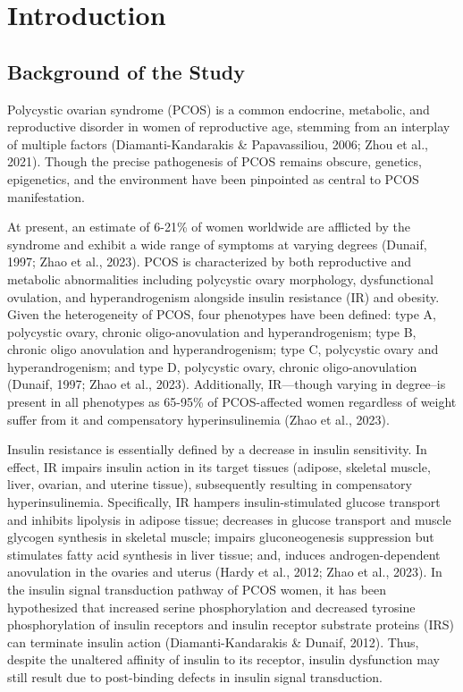 \chapter{Introduction}
\section{Background of the Study}
 Polycystic ovarian syndrome (PCOS) is a common endocrine, metabolic, and reproductive disorder in women of reproductive age, stemming from an interplay of multiple factors (Diamanti-Kandarakis \& Papavassiliou, 2006; Zhou et al., 2021). Though the precise pathogenesis of PCOS remains obscure, genetics, epigenetics, and the environment have been pinpointed as central to PCOS manifestation. 
 
 At present, an estimate of 6-21\% of women worldwide are afflicted by the syndrome and exhibit a wide range of symptoms at varying degrees (Dunaif, 1997; Zhao et al., 2023). PCOS is characterized by both reproductive and metabolic abnormalities including polycystic ovary morphology, dysfunctional ovulation, and hyperandrogenism alongside insulin resistance (IR) and obesity. Given the heterogeneity of PCOS, four phenotypes have been defined: type A, polycystic ovary, chronic oligo-anovulation and hyperandrogenism; type B, chronic oligo anovulation and hyperandrogenism; type C, polycystic ovary and hyperandrogenism; and type D, polycystic ovary, chronic oligo-anovulation (Dunaif, 1997; Zhao et al., 2023). Additionally, IR—though varying in degree–is present in all phenotypes as 65-95\% of PCOS-affected women regardless of weight suffer from it and compensatory hyperinsulinemia (Zhao et al., 2023). 

Insulin resistance is essentially defined by a decrease in insulin sensitivity. In effect, IR impairs insulin action in its target tissues (adipose, skeletal muscle, liver, ovarian, and uterine tissue), subsequently resulting in compensatory hyperinsulinemia. Specifically, IR hampers insulin-stimulated glucose transport and inhibits lipolysis in adipose tissue; decreases in glucose transport and muscle glycogen synthesis in skeletal muscle; impairs gluconeogenesis suppression but stimulates fatty acid synthesis in liver tissue; and, induces androgen-dependent anovulation in the ovaries and uterus (Hardy et al., 2012; Zhao et al., 2023). In the insulin signal transduction pathway of PCOS women, it has been hypothesized that increased serine phosphorylation and decreased tyrosine phosphorylation of insulin receptors and insulin receptor substrate proteins (IRS) can terminate insulin action (Diamanti-Kandarakis \& Dunaif, 2012). Thus, despite the unaltered affinity of insulin to its receptor, insulin dysfunction may still result due to post-binding defects in insulin signal transduction.

